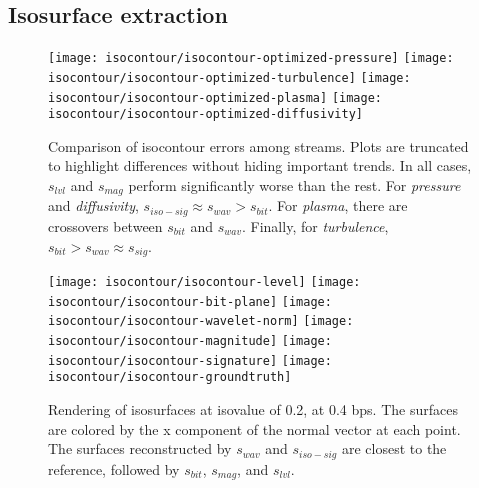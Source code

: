\subsection{Isosurface extraction}\label{sec:isocontour}

\begin{figure}[h]
	\centering
	{\texttt{[image: isocontour/isocontour-optimized-pressure]}}
	{\texttt{[image: isocontour/isocontour-optimized-turbulence]}}
	{\texttt{[image: isocontour/isocontour-optimized-plasma]}}
	{\texttt{[image: isocontour/isocontour-optimized-diffusivity]}}
	\caption{Comparison of isocontour errors among streams. Plots are truncated to highlight
	differences without hiding important trends. In all cases, $s_{lvl}$ and $s_{mag}$ perform
	significantly worse than the rest. For \emph{pressure} and \emph{diffusivity}, $s_{iso-sig}
	\approx s_{wav} > s_{bit}$. For \emph{plasma}, there are crossovers between $s_{bit}$ and
	$s_{wav}$. Finally, for \emph{turbulence}, $s_{bit} > s_{wav}\approx
	s_{sig}$.}\label{fig:isocontour-plots}
\end{figure}

\begin{figure}[h]
	\centering
	{\texttt{[image: isocontour/isocontour-level]}}
	{\texttt{[image: isocontour/isocontour-bit-plane]}}
	{\texttt{[image: isocontour/isocontour-wavelet-norm]}}
	{\texttt{[image: isocontour/isocontour-magnitude]}}
	{\texttt{[image: isocontour/isocontour-signature]}}
	{\texttt{[image: isocontour/isocontour-groundtruth]}} \caption{Rendering of
	isosurfaces at isovalue of 0.2, at 0.4 bps. The surfaces are colored by the x component of the
	normal vector at each point. The surfaces reconstructed by $s_{wav}$ and $s_{iso-sig}$ are closest to the reference, followed by $s_{bit}$, $s_{mag}$, and $s_{lvl}$.}
	\label{fig:isocontour-surfaces-pressure}
\end{figure}

